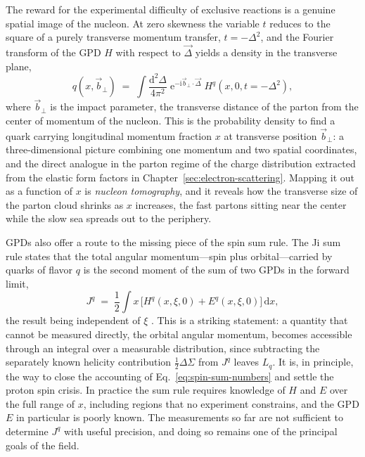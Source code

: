 The reward for the experimental difficulty of exclusive reactions is a genuine spatial
image of the nucleon. At zero skewness the variable $t$ reduces to the square of a purely
transverse momentum transfer, $t=-\Delta^{2}$, and the Fourier transform of the GPD $H$
with respect to $\vec\Delta$ yields a density in the transverse plane,
\begin{equation}
    q(x,\vec b_{\perp}) \;=\; \int\frac{\mathrm{d}^{2}\Delta}{4\pi^{2}}\;
    \mathrm{e}^{-\mathrm{i}\vec b_{\perp}\cdot\vec\Delta}\;
    H^{q}(x,0,t=-\Delta^{2}),
    \label{eq:impact-parameter}
\end{equation}
where $\vec b_{\perp}$ is the impact parameter, the transverse distance of the parton from
the center of momentum of the nucleon. This is the probability density to find a quark
carrying longitudinal momentum fraction $x$ at transverse position $\vec b_{\perp}$: a
three-dimensional picture combining one momentum and two spatial coordinates, and the
direct analogue in the parton regime of the charge distribution extracted from the elastic
form factors in Chapter~\ref{sec:electron-scattering}. Mapping it out as a function of $x$
is \emph{nucleon tomography}, and it reveals how the transverse size of the parton cloud
shrinks as $x$ increases, the fast partons sitting near the center while the slow sea
spreads out to the periphery.

GPDs also offer a route to the missing piece of the spin sum rule. The Ji sum rule states
that the total angular momentum---spin plus orbital---carried by quarks of flavor $q$ is
the second moment of the sum of two GPDs in the forward limit,
\begin{equation}
    J^{q} \;=\; \frac{1}{2}\int x\,\bigl[H^{q}(x,\xi,0) + E^{q}(x,\xi,0)\bigr]\,\mathrm{d}x,
    \label{eq:ji-sum-rule}
\end{equation}
the result being independent of $\xi$ \cite[Ch.~4.8]{ThomasWeise2001}. This is a striking
statement: a quantity that
cannot be measured directly, the orbital angular momentum, becomes accessible through an
integral over a measurable distribution, since subtracting the separately known helicity
contribution $\tfrac{1}{2}\Delta\Sigma$ from $J^{q}$ leaves $L_{q}$. It is, in principle,
the way to close the accounting of Eq.~\eqref{eq:spin-sum-numbers} and settle the proton
spin crisis. In practice the sum rule requires knowledge of $H$ and $E$ over the full
range of $x$, including regions that no experiment constrains, and the GPD $E$ in
particular is poorly known. The measurements so far are not sufficient to determine
$J^{q}$ with useful precision, and doing so remains one of the principal goals of the
field.

